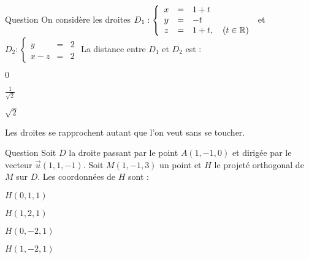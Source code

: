 \begin{multi}[multiple,feedback=
{Si \(D_1\) passe par un point \(A_1\) et est dirigée par un vecteur \(\vec{u_1}\) et 
\(D_2\) passe par un point \(A_2\) et est dirigée par un vecteur \(\vec{u_2}\), la distance entre \(D_1\) et \(D_2\) est donnée par : \(\frac{|\det(\overrightarrow{A_1A_2},\vec{u_1}, \vec{u_2})|}{\Vert \vec{u_1} \wedge \vec{u_2} \Vert }\).
}]{Question}
On considère les droites \(D_1 : \left\{\begin{array}{ccl}x&=&1+t\\y&=&-t\\ z&=&1+t,\quad (t \in \mathbb{R})  \end{array}\right.\) et 
\(D_2 : \left\{\begin{array}{ccl}y&=&2\\x-z&=&2 \end{array}\right.\)
La distance entre \(D_1\) et \(D_2\) est :

    \item \(0\)
    \item \(\frac{1}{\sqrt 2}\)
    \item* \(\sqrt 2\)
    \item Les droites se rapprochent autant que l'on veut sans se toucher.
\end{multi}


\begin{multi}[multiple,feedback=
{\(H\in D\), donc il existe \(t \in \Rr\) tel que \(H(1+t,-1+t,-t)\). On calcule \(t\) en utilisant l'égalité : \(\overrightarrow{HM} \cdot \vec{u} = 0\).
}]{Question}
Soit \(D\) la droite passant par le point \(A(1,-1,0)\) et dirigée par le vecteur \(\vec{u}(1,1,-1)\). Soit \(M(1,-1,3)\) un point et \(H\) le projeté orthogonal de \(M\) sur \(D\). Les coordonnées de \(H\) sont :

    \item \(H(0,1,1)\)
    \item \(H(1,2,1)\)
    \item* \(H(0,-2,1)\)
    \item \(H(1,-2,1)\)
\end{multi}


